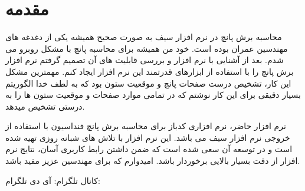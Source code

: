 \section*{مقدمه}

محاسبه برش پانچ در نرم افزار سیف به صورت صحیح  همیشه یکی از دغدغه های مهندسین عمران بوده است. خود من همیشه برای محاسبه پانچ با مشکل روبرو می شدم. بعد از آشنایی با نرم افزار 
و بررسی قابلیت های آن تصمیم گرفتم نرم افزار برش پانچ را با استفاده از ابزارهای قدرتمند این نرم افزار ایجاد کنم. مهمترین مشکل این کار، تشخیص درست صفحات پانچ و موقعیت ستون بود که به لطف خدا  الگوریتم
بسیار دقیقی برای این کار نوشتم که در تمامی موارد صفحات و موقعیت ستون ها را به درستی تشخیص میدهد.


نرم افزار حاضر، نرم افزاری کدباز برای محاسبه برش پانچ فنداسیون با استفاده از خروجی نرم افزار سیف می باشد. این نرم افزار با تلاش های شبانه روزی تهیه شده است و در توسعه آن سعی شده است که ضمن داشتن رابط کاربری آسان، 
نتایج نرم افزار از دقت بسیار بالایی برخوردار باشد. امیدوارم که  برای مهندسین عزیز مفید باشد.



کانال تلگرام:  \newline
آی دی تلگرام: 

\newpage